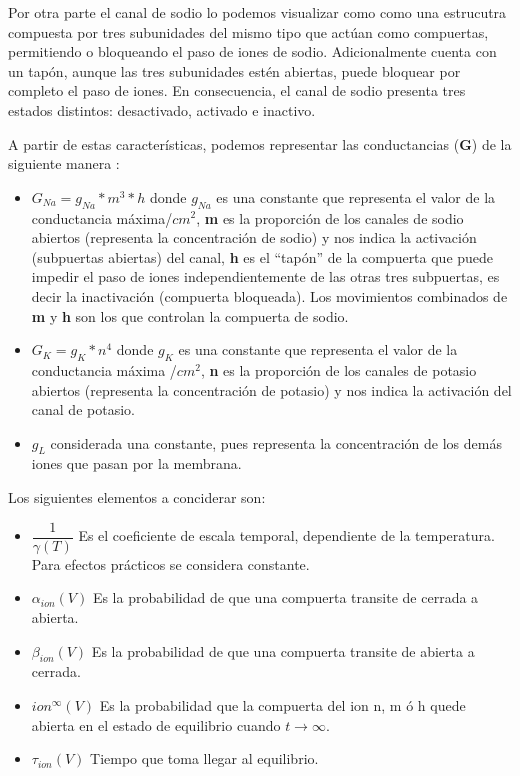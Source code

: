 Por otra parte el canal de sodio lo podemos visualizar como 
como una estrucutra compuesta por tres subunidades del mismo tipo
que actúan como compuertas, permitiendo o bloqueando el paso de iones de sodio. Adicionalmente cuenta con un tapón, aunque las tres subunidades estén abiertas, puede bloquear por completo el paso de iones. En consecuencia, el canal de sodio presenta tres estados distintos: desactivado, activado e inactivo.
 
A partir de estas características, podemos representar las conductancias (\textbf{G}) de la siguiente manera \parencite{HH52}:


\begin{itemize}
 \item \({G_{Na}} = g_{Na} * m ^3 * h \) donde \(g_{Na}\) es una constante que representa el valor de la conductancia máxima/\(cm ^2\), \textbf{m} es la proporción de los canales de sodio abiertos (representa la concentración de sodio) y nos indica la activación (subpuertas abiertas) del canal, \textbf{h} es el “tapón” de la compuerta que puede impedir el paso de iones independientemente de las otras tres subpuertas, es decir la inactivación (compuerta bloqueada).
Los movimientos combinados de \textbf{m} y \textbf{h} son los que controlan la compuerta de sodio.
 \item \({G_{K}} = g_{K} * n^4\) donde \(g_{K}\) es una constante que representa el valor de la conductancia máxima /\(cm^2\), \textbf{n} es la proporción de los canales de potasio abiertos (representa la concentración de potasio) y nos indica la activación del canal de potasio.
 \item \(g_{L}\) considerada una constante, pues representa la concentración de los demás iones que pasan por la membrana.
\end{itemize}

Los siguientes elementos a conciderar son:


\begin{itemize}
 \item \(\dfrac{1}{\gamma(T)}\) Es el coeficiente de escala temporal, dependiente de la temperatura. Para efectos prácticos se considera constante.
 \item \(\alpha_{ion}(V)\) Es la probabilidad de que una compuerta transite de cerrada a abierta.
 \item \(\beta_{ion}(V)\) Es la probabilidad de que una compuerta transite de abierta a cerrada.
 \item \(ion^\infty(V)\) Es la probabilidad que la compuerta del ion n, m ó h quede abierta en el estado de equilibrio cuando \(t \rightarrow \infty\).
 
 \item \(\tau_{ion}(V)\) Tiempo que toma llegar al equilibrio.
\end{itemize}

